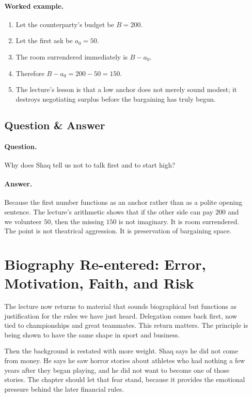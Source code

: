 \paragraph{Worked example.}
\begin{enumerate}
\item Let the counterparty's budget be \(B=200\).
\item Let the first ask be \(a_0=50\).
\item The room surrendered immediately is \(B-a_0\).
\item Therefore \(B-a_0=200-50=150\).
\item The lecture's lesson is that a low anchor does not merely sound modest; it destroys negotiating surplus before the bargaining has truly begun.
\end{enumerate}

\subsection{Question \& Answer}

\paragraph{Question.} Why does Shaq tell us not to talk first and to start high?

\paragraph{Answer.} Because the first number functions as an anchor rather than as a polite opening sentence. The lecture's arithmetic shows that if the other side can pay \(200\) and we volunteer \(50\), then the missing \(150\) is not imaginary. It is room surrendered. The point is not theatrical aggression. It is preservation of bargaining space.

\section{Biography Re-entered: Error, Motivation, Faith, and Risk}

The lecture now returns to material that sounds biographical but functions as justification for the rules we have just heard. Delegation comes back first, now tied to championships and great teammates. This return matters. The principle is being shown to have the same shape in sport and business.

Then the background is restated with more weight. Shaq says he did not come from money. He says he saw horror stories about athletes who had nothing a few years after they began playing, and he did not want to become one of those stories. The chapter should let that fear stand, because it provides the emotional pressure behind the later financial rules.

